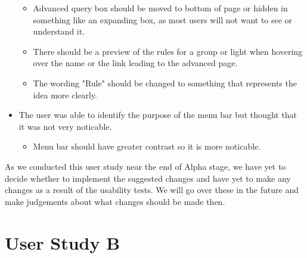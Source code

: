 \documentclass[oneside,openright]{book}
\begin{document}
\begin{itemize}
\begin{itemize}
      \item Advanced query box should be moved to bottom of page or hidden in something like an expanding box, as most users will not want to see or understand it.
      \item There should be a preview of the rules for a group or light when hovering over the name or the link leading to the advanced page.
      \item The wording "Rule" should be changed to something that represents the idea more clearly.
    \end{itemize}
  \item The user was able to identify the purpose of the menu bar but thought that it was not very noticable.
    \begin{itemize}
      \item Menu bar should have greater contrast so it is more noticable.
    \end{itemize}
\end{itemize}
As we conducted this user study near the end of Alpha stage, we have yet to decide whether to implement the suggested changes and have yet to make any changes as a result of the usability tests. We will go over these in the future and make judgements about what changes should be made then.

\section{User Study B}
\end{document}
